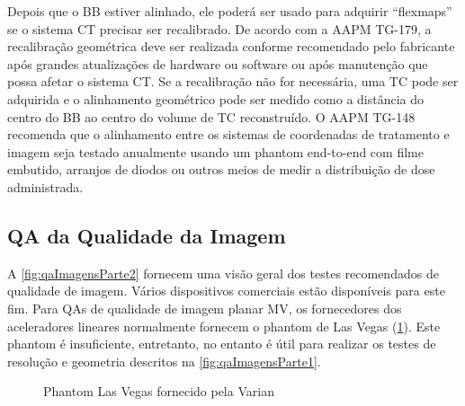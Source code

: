 \documentclass[11pt,a4paper]{article}
\begin{document}
    Depois que o BB estiver alinhado, ele poderá ser usado para adquirir “flexmaps” se o sistema CT precisar ser recalibrado. De acordo com a AAPM TG-179, a recalibração geométrica deve ser realizada conforme recomendado pelo fabricante após grandes atualizações de hardware ou software ou após manutenção que possa afetar o sistema CT. Se a recalibração não for necessária, uma TC pode ser adquirida e o alinhamento geométrico pode ser medido como a distância do centro do BB ao centro do volume de TC reconstruído. O AAPM TG-148 recomenda que o alinhamento entre os sistemas de coordenadas de tratamento e imagem seja testado anualmente usando um phantom end-to-end com filme embutido, arranjos de diodos ou outros meios de medir a distribuição de dose administrada.

\subsection*{QA da Qualidade da Imagem}

    A \ref{fig:qaImagensParte2} fornecem uma visão geral dos testes recomendados de qualidade de imagem. Vários dispositivos comerciais estão disponíveis para este fim. Para QAs de qualidade de imagem planar MV, os fornecedores dos aceleradores lineares normalmente fornecem o phantom de Las Vegas (\ref{fig:lasVegasPhantom}). Este phantom é insuficiente, entretanto, no entanto é útil para realizar os testes de resolução e geometria descritos na \ref{fig:qaImagensParte1}.

    \begin{figure}[h]
        \centering
        \caption{Phantom Las Vegas fornecido pela Varian}
        \label{fig:lasVegasPhantom}
    \end{figure}
\end{document}

